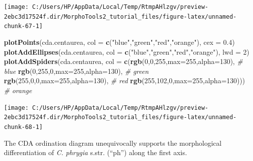 \documentclass[
]{article}
\newenvironment{Shaded}{\begin{snugshade}}{\end{snugshade}}
\newcommand{\CommentTok}[1]{\textcolor[rgb]{0.56,0.35,0.01}{\textit{#1}}}
\newcommand{\DataTypeTok}[1]{\textcolor[rgb]{0.13,0.29,0.53}{#1}}
\newcommand{\DecValTok}[1]{\textcolor[rgb]{0.00,0.00,0.81}{#1}}
\newcommand{\FloatTok}[1]{\textcolor[rgb]{0.00,0.00,0.81}{#1}}
\newcommand{\KeywordTok}[1]{\textcolor[rgb]{0.13,0.29,0.53}{\textbf{#1}}}
\newcommand{\NormalTok}[1]{#1}
\newcommand{\StringTok}[1]{\textcolor[rgb]{0.31,0.60,0.02}{#1}}
\begin{document}
\begin{center}\texttt{[image: C:/Users/HP/AppData/Local/Temp/RtmpAHlzgv/preview-2ebc3d17524f.dir/MorphoTools2\_tutorial\_files/figure-latex/unnamed-chunk-67-1]} \end{center}

\begin{Shaded}
\begin{Highlighting}[]
\KeywordTok{plotPoints}\NormalTok{(cda.centaurea, }\DataTypeTok{col =} \KeywordTok{c}\NormalTok{(}\StringTok{"blue"}\NormalTok{,}\StringTok{"green"}\NormalTok{,}\StringTok{"red"}\NormalTok{,}\StringTok{"orange"}\NormalTok{), }\DataTypeTok{cex =} \FloatTok{0.4}\NormalTok{)}
\KeywordTok{plotAddEllipses}\NormalTok{(cda.centaurea, }\DataTypeTok{col =} \KeywordTok{c}\NormalTok{(}\StringTok{"blue"}\NormalTok{,}\StringTok{"green"}\NormalTok{,}\StringTok{"red"}\NormalTok{,}\StringTok{"orange"}\NormalTok{), }\DataTypeTok{lwd =} \DecValTok{2}\NormalTok{)}
\KeywordTok{plotAddSpiders}\NormalTok{(cda.centaurea, }\DataTypeTok{col =} \KeywordTok{c}\NormalTok{(}\KeywordTok{rgb}\NormalTok{(}\DecValTok{0}\NormalTok{,}\DecValTok{0}\NormalTok{,}\DecValTok{255}\NormalTok{,}\DataTypeTok{max=}\DecValTok{255}\NormalTok{,}\DataTypeTok{alpha=}\DecValTok{130}\NormalTok{), }\CommentTok{# blue}
                                      \KeywordTok{rgb}\NormalTok{(}\DecValTok{0}\NormalTok{,}\DecValTok{255}\NormalTok{,}\DecValTok{0}\NormalTok{,}\DataTypeTok{max=}\DecValTok{255}\NormalTok{,}\DataTypeTok{alpha=}\DecValTok{130}\NormalTok{), }\CommentTok{# green}
                                      \KeywordTok{rgb}\NormalTok{(}\DecValTok{255}\NormalTok{,}\DecValTok{0}\NormalTok{,}\DecValTok{0}\NormalTok{,}\DataTypeTok{max=}\DecValTok{255}\NormalTok{,}\DataTypeTok{alpha=}\DecValTok{130}\NormalTok{), }\CommentTok{# red}
                                      \KeywordTok{rgb}\NormalTok{(}\DecValTok{255}\NormalTok{,}\DecValTok{102}\NormalTok{,}\DecValTok{0}\NormalTok{,}\DataTypeTok{max=}\DecValTok{255}\NormalTok{,}\DataTypeTok{alpha=}\DecValTok{130}\NormalTok{))) }\CommentTok{# orange}
\end{Highlighting}
\end{Shaded}

\begin{center}\texttt{[image: C:/Users/HP/AppData/Local/Temp/RtmpAHlzgv/preview-2ebc3d17524f.dir/MorphoTools2\_tutorial\_files/figure-latex/unnamed-chunk-68-1]} \end{center}

The CDA ordination diagram unequivocally supports the morphological
differentiation of \emph{C. phrygia} s.str. (``ph'') along the first
axis.
\end{document}
